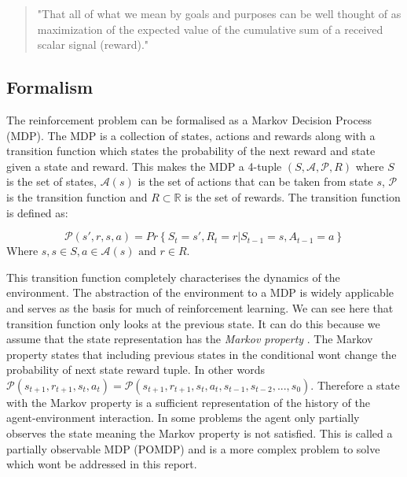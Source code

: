 \begin{quote}
    "That all of what we mean by goals and purposes can be well thought of as maximization of the expected value of the cumulative sum of a received scalar signal (reward)." 
    \cite{suttonReinforcementLearningSecond2018}
    \label{quote:reward}
\end{quote}

\subsection{Formalism}

The reinforcement problem can be formalised as a Markov Decision Process (MDP). The MDP is a collection of states, actions and rewards along with a transition function which states the probability of the next reward and state given a state and reward. This makes the MDP a 4-tuple $(S,\mathcal{A}, \mathcal{P}, R)$ where $S$ is the set of states, $\mathcal{A}(s)$ is the set of actions that can be taken from state $s$, $\mathcal{P}$ is the transition function and $R \subset \mathbb{R}$ is the set of rewards. The transition function is defined as:

\begin{equation}
\mathcal{P}(s',r, s,a) = Pr\left\{ S_{t}=s', R_{t}=r | S_{t-1}=s, A_{t-1}=a \right\}
\label{eq:transition}
\end{equation}
Where $s,s \in S, a \in \mathcal{A}(s) \text{ and } r \in R$.

This transition function completely characterises the dynamics of the environment. The abstraction of the environment to a MDP is widely applicable and serves as the basis for much of reinforcement learning. We can see here that transition function only looks at the previous state. It can do this because we assume that the state representation has the \textit{Markov property} \cite{suttonReinforcementLearningSecond2018}. The Markov property states that including previous states in the conditional wont change the probability of next state reward tuple. In other words $\mathcal{P}(s_{t+1}, r_{t+1}, s_{t},a_{t}) = \mathcal{P}(s_{t+1}, r_{t+1}, s_{t},a_{t}, s_{t-1}, s_{t-2}, ... , s_{0})$. Therefore a state with the Markov property is a sufficient representation of the history of the agent-environment interaction. In some problems the agent only partially observes the state meaning the Markov property is not satisfied. This is called a partially observable MDP (POMDP) and is a more complex problem to solve which wont be addressed in this report.

